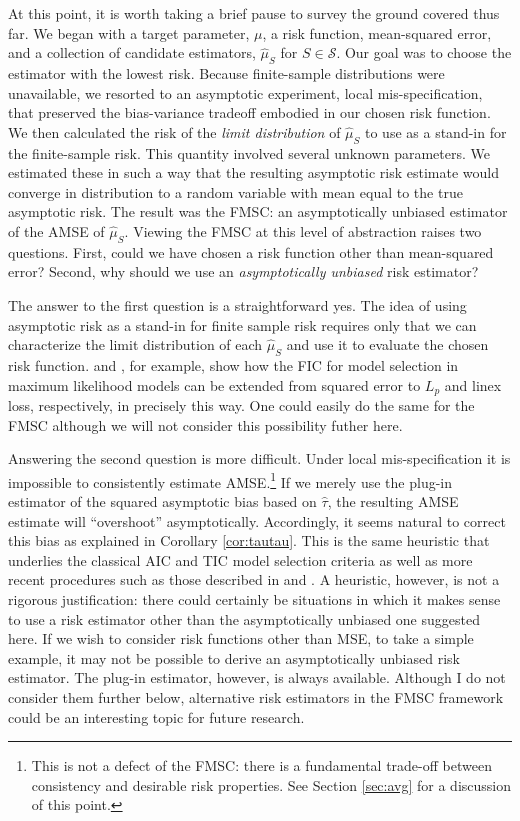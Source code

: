 At this point, it is worth taking a brief pause to survey the ground covered thus far.
We began with a target parameter, $\mu$, a risk function, mean-squared error, and a collection of candidate estimators, $\widehat{\mu}_S$ for $S\in\mathscr{S}$. 
Our goal was to choose the estimator with the lowest risk.
Because finite-sample distributions were unavailable, we resorted to an asymptotic experiment, local mis-specification, that preserved the bias-variance tradeoff embodied in our chosen risk function.
We then calculated the risk of the \emph{limit distribution} of $\widehat{\mu}_S$ to use as a stand-in for the finite-sample risk. 
This quantity involved several unknown parameters.
We estimated these in such a way that the resulting asymptotic risk estimate would converge in distribution to a random variable with mean equal to the true asymptotic risk.
The result was the FMSC: an asymptotically unbiased estimator of the AMSE of $\widehat{\mu}_S$.
Viewing the FMSC at this level of abstraction raises two questions.
First, could we have chosen a risk function other than mean-squared error?
Second, why should we use an \emph{asymptotically unbiased} risk estimator? 

The answer to the first question is a straightforward yes.
The idea of using asymptotic risk as a stand-in for finite sample risk requires only that we can characterize the limit distribution of each $\widehat{\mu}_S$ and use it to evaluate the chosen risk function.
\cite{Claeskens2006} and \cite{ClaeskensHjort2008}, for example, show how the FIC for model selection in maximum likelihood models can be extended from squared error to $L_p$ and linex loss, respectively, in precisely this way.
One could easily do the same for the FMSC although we will not consider this possibility futher here.

Answering the second question is more difficult.
Under local mis-specification it is impossible to consistently estimate AMSE.\footnote{This is not a defect of the FMSC: there is a fundamental trade-off between consistency and desirable risk properties. See Section \ref{sec:avg} for a discussion of this point.}
If we merely use the plug-in estimator of the squared asymptotic bias based on $\widehat{\tau}$, the resulting AMSE estimate will ``overshoot'' asymptotically.
Accordingly, it seems natural to correct this bias as explained in Corollary \ref{cor:tautau}.
This is the same heuristic that underlies the classical AIC and TIC model selection criteria as well as more recent procedures such as those described in \cite{ClaeskensHjort2003} and \cite{Schorfheide2005}.
A heuristic, however, is not a rigorous justification: there could certainly be situations in which it makes sense to use a risk estimator other than the asymptotically unbiased one suggested here.
If we wish to consider risk functions other than MSE, to take a simple example, it may not be possible to derive an asymptotically unbiased risk estimator.
The plug-in estimator, however, is always available.
Although I do not consider them further below, alternative risk estimators in the FMSC framework could be an interesting topic for future research.

